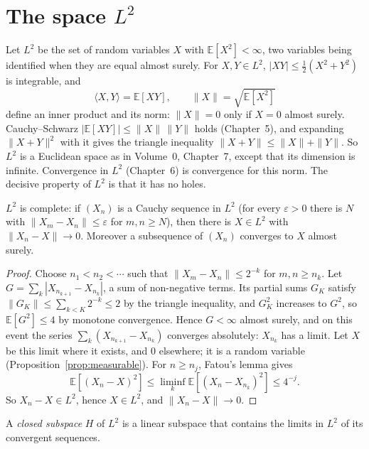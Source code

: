 \section{The space \texorpdfstring{$L^2$}{L2}}

Let $L^2$ be the set of random variables $X$ with $\mathbb E[X^2]<\infty$, two variables being identified when they are equal almost surely.
For $X,Y\in L^2$, $|XY|\le\frac12(X^2+Y^2)$ is integrable, and
\[
\langle X,Y\rangle=\mathbb E[XY],\qquad\|X\|=\sqrt{\mathbb E[X^2]}
\]
define an inner product and its norm: $\|X\|=0$ only if $X=0$ almost surely. Cauchy--Schwarz $|\mathbb E[XY]|\le\|X\|\,\|Y\|$ holds (Chapter~5), and
expanding $\|X+Y\|^2$ with it gives the triangle inequality $\|X+Y\|\le\|X\|+\|Y\|$. So $L^2$ is a Euclidean space as in Volume~0, Chapter~7, except
that its dimension is infinite. Convergence in $L^2$ (Chapter~6) is convergence for this norm. The decisive property of
$L^2$ is that it has no holes.

\begin{theorem}\label{thm:complete}
$L^2$ is complete: if $(X_n)$ is a Cauchy sequence in $L^2$ (for every $\varepsilon>0$ there is $N$ with $\|X_m-X_n\|\le\varepsilon$ for $m,n\ge N$), then there is
$X\in L^2$ with $\|X_n-X\|\to0$. Moreover a subsequence of $(X_n)$ converges to $X$ almost surely.
\end{theorem}
\begin{proof}
Choose $n_1<n_2<\cdots$ such that $\|X_m-X_n\|\le2^{-k}$ for $m,n\ge n_k$. Let $G=\sum_k|X_{n_{k+1}}-X_{n_k}|$, a sum of non-negative terms. Its partial sums $G_K$ satisfy
$\|G_K\|\le\sum_{k<K}2^{-k}\le2$ by the triangle inequality, and $G_K^2$ increases to $G^2$, so $\mathbb E[G^2]\le4$ by monotone convergence. Hence $G<\infty$ almost
surely, and on this event the series $\sum_k(X_{n_{k+1}}-X_{n_k})$ converges absolutely: $X_{n_k}$ has a limit. Let $X$ be this limit where it exists, and $0$
elsewhere; it is a random variable (Proposition~\ref{prop:measurable}). For $n\ge n_j$, Fatou's lemma gives
\[
\mathbb E[(X_n-X)^2]\le\liminf_k\mathbb E[(X_n-X_{n_k})^2]\le4^{-j}.
\]
So $X_n-X\in L^2$, hence $X\in L^2$, and $\|X_n-X\|\to0$.
\end{proof}

A \emph{closed subspace} $H$ of $L^2$ is a linear subspace that contains the limits in $L^2$ of its convergent sequences.

